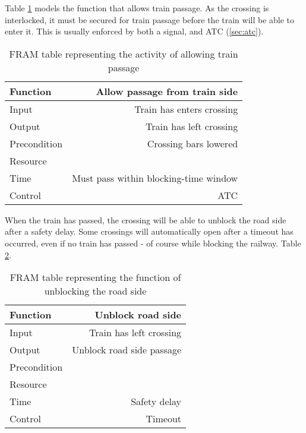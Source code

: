 Table \ref{table:function_allow_passage_from_train_side} models the function that allows train passage. As the crossing is interlocked, it must be secured for train passage before the train will be able to enter it. This is usually enforced by both a signal, and ATC (\ref{sec:atc}).

\begin{table}[h]
\centering
    \begin{tabular}{ | l | r | }
    \hline
    Function     &  Allow passage from train side \\ \hline \hline
    Input        &  Train has enters crossing\\ \hline
    Output       &  Train has left crossing\\ \hline
    Precondition &  Crossing bars lowered\\ \hline
    Resource     &  \\ \hline
    Time         &  Must pass within blocking-time window\\ \hline
    Control      &  ATC\\ \hline
    \end{tabular}
\caption{FRAM table representing the activity of allowing train passage}
\label{table:function_allow_passage_from_train_side}
\end{table}
When the train has passed, the crossing will be able to unblock the road side after a safety delay. Some crossings will automatically open after a timeout has occurred, even if no train has passed - of course while blocking the railway. Table \ref{table:function_unblock_road_side}.
\begin{table}[h]
\centering
    \begin{tabular}{ | l | r | }
    \hline
    Function     &  Unblock road side \\ \hline \hline
    Input        &  Train has left crossing\\ \hline
    Output       &  Unblock road side passage\\ \hline
    Precondition &  \\ \hline
    Resource     &  \\ \hline
    Time         &  Safety delay\\ \hline
    Control      &  Timeout\\ \hline
    \end{tabular}
\caption{FRAM table representing the function of unblocking the road side}
\label{table:function_unblock_road_side}
\end{table}

